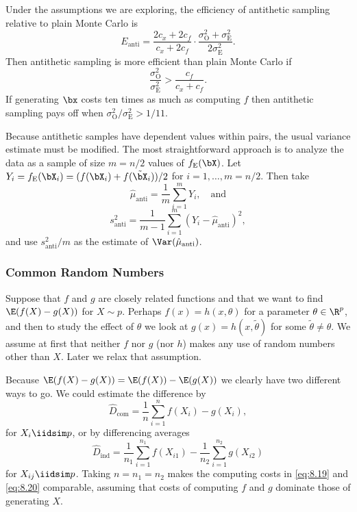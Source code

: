 Under the assumptions we are exploring, the efficiency of antithetic sampling relative to plain Monte Carlo is
\begin{equation} \label{eq:EfficiencyRatio}
	E_{\mathrm{anti}} = \frac{2c_x + 2c_f}{c_x + 2c_f} \cdot \frac{\sigma_{\mathrm{O}}^2 + \sigma_{\mathrm{E}}^2}{2\sigma_{\mathrm{E}}^2}.
\end{equation}
Then antithetic sampling is more efficient than plain Monte Carlo if
\begin{equation*}
	\frac{\sigma_{\mathrm{O}}^2}{\sigma_{\mathrm{E}}^2} > \frac{c_f}{c_x + c_f}.
\end{equation*}
If generating $\bx$ costs ten times as much as computing $f$ then antithetic sampling pays off when $\sigma_{\mathrm{O}}^2/\sigma_{\mathrm{E}}^2 > 1/11$.

Because antithetic samples have dependent values within pairs, the usual variance estimate must be modified. The most straightforward approach is to analyze the data as a sample of size $m = n/2$ values of $f_{\mathrm{E}}(\bX)$. Let $Y_i = f_{\mathrm{E}}(\bX_i) = (f(\bX_i) + f(\tilde{\bX}_i))/2$ for $i = 1, \dots, m = n/2$. Then take
\begin{equation*}
	\hat{\mu}_{\mathrm{anti}} = \frac{1}{m} \sum_{i=1}^m Y_i, \quad \text{and}
\end{equation*}
\begin{equation*}
	s_{\mathrm{anti}}^2 = \frac{1}{m-1} \sum_{i=1}^m (Y_i - \hat{\mu}_{\mathrm{anti}})^2,
\end{equation*}
and use $s_{\mathrm{anti}}^2/m$ as the estimate of $\Var(\hat{\mu}_{\mathrm{anti}})$.

\subsubsection{Common Random Numbers}
Suppose that $f$ and $g$ are closely related functions and that we want to find $\E(f(X) - g(X))$ for $X \sim p$. Perhaps $f(x) = h(x, \theta)$ for a parameter $\theta \in \R^p$, and then to study the effect of $\theta$ we look at $g(x) = h(x, \widetilde{\theta})$ for some $\widetilde{\theta} \neq \theta$. We assume at first that neither $f$ nor $g$ (nor $h$) makes any use of random numbers other than $X$. Later we relax that assumption.

Because $\E(f(X)-g(X)) = \E(f(X))-\E(g(X))$ we clearly have two different ways to go. We could estimate the difference by
\begin{equation}
	\widehat{D}_{\text{com}} = \frac{1}{n} \sum_{i=1}^n f(X_i) - g(X_i),
	\label{eq:8.19}
\end{equation}
for $X_i \iidsim p$, or by differencing averages
\begin{equation}
	\widehat{D}_{\text{ind}} = \frac{1}{n_1} \sum_{i=1}^{n_1} f(X_{i1}) - \frac{1}{n_2} \sum_{i=1}^{n_2} g(X_{i2})
	\label{eq:8.20}
\end{equation}
for $X_{ij} \iidsim p$. Taking $n = n_1 = n_2$ makes the computing costs in \eqref{eq:8.19} and \eqref{eq:8.20} comparable, assuming that costs of computing $f$ and $g$ dominate those of generating $X$.

